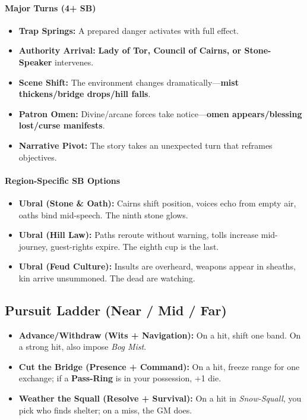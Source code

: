 \paragraph{Major Turns (4+ SB)}
\begin{itemize}
\item \textbf{Trap Springs:} A prepared danger activates with full effect.
\item \textbf{Authority Arrival:} \textbf{Lady of Tor, Council of Cairns, or Stone-Speaker} intervenes.
\item \textbf{Scene Shift:} The environment changes dramatically---\textbf{mist thickens/bridge drops/hill falls}.
\item \textbf{Patron Omen:} Divine/arcane forces take notice---\textbf{omen appears/blessing lost/curse manifests}.
\item \textbf{Narrative Pivot:} The story takes an unexpected turn that reframes objectives.
\end{itemize}

\paragraph{Region-Specific SB Options}
\begin{itemize}
\item \textbf{Ubral (Stone \& Oath):} Cairns shift position, voices echo from empty air, oaths bind mid-speech. The ninth stone glows.
\item \textbf{Ubral (Hill Law):} Paths reroute without warning, tolls increase mid-journey, guest-rights expire. The eighth cup is the last.
\item \textbf{Ubral (Feud Culture):} Insults are overheard, weapons appear in sheaths, kin arrive unsummoned. The dead are watching.
\end{itemize}

\subsection*{Pursuit Ladder (Near / Mid / Far)}
\begin{itemize}
\item \textbf{Advance/Withdraw (Wits + Navigation):} On a hit, shift one band. On a strong hit, also impose \emph{Bog Mist}.
\item \textbf{Cut the Bridge (Presence + Command):} On a hit, freeze range for one exchange; if a \textbf{Pass-Ring} is in your possession, +1 die.
\item \textbf{Weather the Squall (Resolve + Survival):} On a hit in \emph{Snow-Squall}, you pick who finds shelter; on a miss, the GM does.
\end{itemize}

